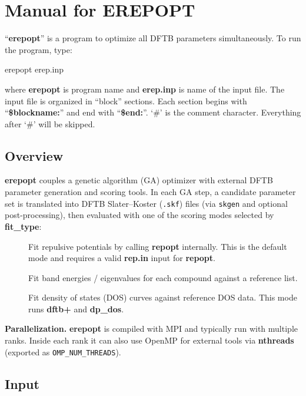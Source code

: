 \chapter{Manual for EREPOPT}
\label{chap:erepopt}

``\textbf{erepopt}'' is a program to optimize all DFTB parameters simultaneously.
To run the program, type: 

{\scriptsize erepopt erep.inp}

where \textbf{erepopt} is program name and \textbf{erep.inp} is name of the
input file. The input file is organized in ``block'' sections. Each section
begins with ``\textbf{\$blockname:}'' and end with ``\textbf{\$end:}''.
`\#' is the comment character. Everything after `\#' will be skipped.

\section{Overview}

\textbf{erepopt} couples a genetic algorithm (GA) optimizer with external DFTB
parameter generation and scoring tools. In each GA step, a candidate parameter
set is translated into DFTB Slater--Koster (\texttt{.skf}) files (via \texttt{skgen}
and optional post-processing), then evaluated with one of the scoring modes
selected by \textbf{fit\_type}:

\begin{description}
\item[] Fit repulsive potentials by calling \textbf{repopt} internally.
This is the default mode and requires a valid \textbf{rep.in} input for \textbf{repopt}.

\item[] Fit band energies / eigenvalues for each compound against a
reference list.

\item[] Fit density of states (DOS) curves against reference DOS data.
This mode runs \textbf{dftb+} and \textbf{dp\_dos}.
\end{description}

\textbf{Parallelization.} \textbf{erepopt} is compiled with MPI and typically
run with multiple ranks. Inside each rank it can also use OpenMP for external
tools via \textbf{nthreads} (exported as \texttt{OMP\_NUM\_THREADS}).

\section{Input}

